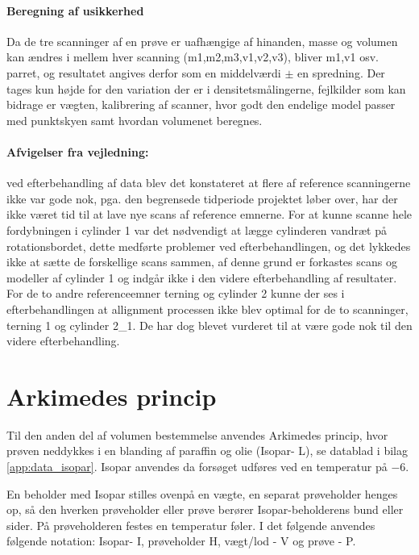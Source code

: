\paragraph{Beregning af usikkerhed}
Da de tre scanninger af en prøve er uafhængige af hinanden, masse og volumen kan ændres i mellem hver scanning (m1,m2,m3,v1,v2,v3), bliver m1,v1 osv. parret, og resultatet angives derfor som en middelværdi $\pm$ en spredning. 
Der tages kun højde for den variation der er i densitetsmålingerne, fejlkilder som kan bidrage er vægten, kalibrering af scanner, hvor godt den endelige model passer med punktskyen samt hvordan volumenet beregnes. 
%
\paragraph{Afvigelser fra vejledning:} ved efterbehandling af data blev det konstateret at flere af reference scanningerne ikke var gode nok, pga. den begrensede tidperiode projektet løber over, har der ikke været tid til at lave nye scans af reference emnerne. For at kunne scanne hele fordybningen i cylinder 1 var det nødvendigt at lægge cylinderen vandræt på rotationsbordet, dette medførte problemer ved efterbehandlingen, og det lykkedes ikke at sætte de forskellige scans sammen, af denne grund er forkastes scans og modeller af cylinder 1 og indgår ikke i den videre efterbehandling af resultater. For de to andre referenceemner terning og cylinder 2 kunne der ses i efterbehandlingen at allignment processen ikke blev optimal for de to scanninger, terning 1 og cylinder 2\_1. De har dog blevet vurderet til at være gode nok til den videre efterbehandling.

\FloatBlock
\section{Arkimedes princip}
Til den anden del af volumen bestemmelse anvendes Arkimedes princip, hvor prøven neddykkes i en blanding af paraffin og olie (Isopar- L), se datablad i bilag \vref{app:data_isopar}.
Isopar anvendes da forsøget udføres ved en temperatur på $-6${\celsius}.  

\noindent En beholder med Isopar stilles ovenpå en vægte, en separat prøveholder henges op, så den hverken prøveholder eller prøve berører Isopar-beholderens bund eller sider. På prøveholderen festes en temperatur føler. I det følgende anvendes følgende notation: Isopar- I, prøveholder H, vægt/lod - V og prøve - P.

